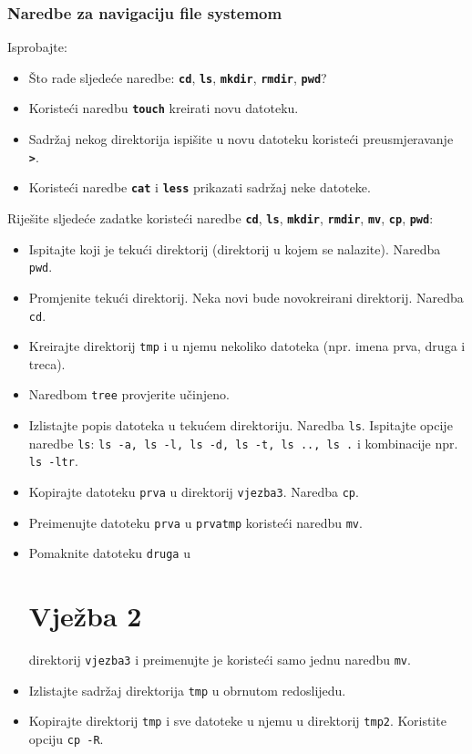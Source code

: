 \subsection*{Naredbe za navigaciju file systemom}
\begin{zadatak}
Isprobajte:
\begin{itemize}
\item Što rade sljedeće naredbe: \textbf{\texttt{cd}}, \textbf{\texttt{ls}}, \textbf{\texttt{mkdir}}, \textbf{\texttt{rmdir}}, \textbf{\texttt{pwd}}?
\item Koristeći naredbu \textbf{\texttt{touch}} kreirati novu datoteku.
\item Sadržaj nekog direktorija ispišite u novu datoteku koristeći preusmjeravanje\textbf{ \texttt{>}}.
\item Koristeći naredbe \textbf{\texttt{cat}} i \textbf{\texttt{less}} prikazati sadržaj neke datoteke.
\end{itemize}

\end{zadatak}

\begin{zadatak} Riješite sljedeće zadatke koristeći naredbe \textbf{\texttt{cd}}, \textbf{\texttt{ls}}, \textbf{\texttt{mkdir}}, \textbf{\texttt{rmdir}}, \textbf{\texttt{mv}}, \textbf{\texttt{cp}}, \textbf{\texttt{pwd}}:
\begin{itemize}
\item Ispitajte koji je tekući direktorij (direktorij u kojem se nalazite). Naredba \texttt{pwd}.
\item Promjenite tekući direktorij. Neka novi bude novokreirani direktorij. Naredba \texttt{cd}.
\item Kreirajte direktorij \texttt{tmp} i u njemu nekoliko datoteka (npr. imena prva, druga i treca).
\item Naredbom \texttt{tree} provjerite učinjeno.
\item Izlistajte popis datoteka u tekućem direktoriju. Naredba \texttt{ls}. Ispitajte opcije naredbe \texttt{ls}: \texttt{ls -a, ls -l, ls -d, ls -t, ls .., ls .} i kombinacije npr. \texttt{ls -ltr}.
\item Kopirajte datoteku \texttt{prva} u direktorij \texttt{vjezba3}. Naredba \texttt{cp}.
\item Preimenujte datoteku \texttt{prva} u \texttt{prvatmp} koristeći naredbu \texttt{mv}.
\item Pomaknite datoteku \texttt{druga} u\chapter{Vježba 2} direktorij \texttt{vjezba3} i preimenujte je koristeći samo jednu naredbu \texttt{mv}.
\item Izlistajte sadržaj direktorija \texttt{tmp} u obrnutom redoslijedu.
\item Kopirajte direktorij \texttt{tmp} i sve datoteke u njemu u direktorij \texttt{tmp2}. Koristite opciju \texttt{cp -R}.
\end{itemize}
\end{zadatak}
